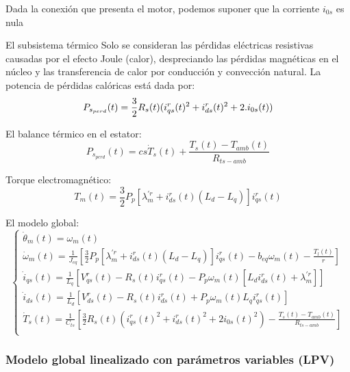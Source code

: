 \documentclass{article}
\begin{document}
Dada la conexión que presenta el motor, podemos suponer que la corriente $i_{0s}$ es nula

El subsistema térmico
Solo se consideran las pérdidas eléctricas resistivas causadas por el efecto Joule (calor),
 despreciando las pérdidas magnéticas en el núcleo y las transferencia de calor por conducción 
y convección natural. La potencia de pérdidas calóricas está dada por:\\
\begin{equation}
    P_{s_{perd}}(t) =  \frac{3}{2}R_{s}(t)(i_{qs}^r(t)^2+i_{ds}^r(t)^2+2.i_{0s}(t))\\
\end{equation}
\par El balance térmico en el estator:
\begin{equation}
    P_{s_{perd}}(t) = cs\dot{T}_{s}(t) + \frac{T_{s}(t)-T_{amb}(t)}{R_{ts-amb}}
\end{equation}

Torque electromagnético:
\begin{equation}\label{eq.torque_electromagnetico}
    T_{m}(t) = \frac{3}{2}P_{p}[\lambda_{m}^{\prime r}+i_{ds}^r(t)(L_{d}-L_{q})]i_{qs}^r(t)
\end{equation}

El modelo global:
\begin{equation}
    \begin{cases}
        \dot{\theta}_{m}(t) = \omega_{m}(t)\\
        \dot{\omega}_{m}(t) = \frac{1}{J_{eq}}[\frac{3}{2}P_{p}[\lambda_{m}^{\prime r}+i_{ds}^r(t)(L_{d}-L_{q})]i_{qs}^r(t) - b_{eq}\omega_{m}(t) - \frac{T_{l}(t)}{r}]\\
        \dot{i}_{qs}(t) = \frac{1}{L_{q}}[V_{qs}^r(t) - R_{s}(t)i_{qs}^r(t) - P_{p}\omega_{m}(t)[L_{d}i_{ds}^r(t)+\lambda_{m}^{\prime r}]]  \\
        \dot{i}_{ds}(t) = \frac{1}{L_{d}}[V_{ds}^r(t) - R_{s}(t)i_{ds}^r(t) + P_{p}\omega_{m}(t)L_{q}i_{qs}^r(t)]  \\
        \dot{T}_{s}(t) = \frac{1}{C_{ts}}[\frac{3}{2}R_{s}(t)({i_{qs}^r(t)}^2+{i_{ds}^r(t)}^2+2i_{0s}(t)^2)-\frac{T_{s}(t)-T_{amb}(t)}{R_{ts-amb}}]\\
    \end{cases}
\end{equation}



\subsubsection*{Modelo global linealizado con parámetros variables (LPV)}
\end{document}
